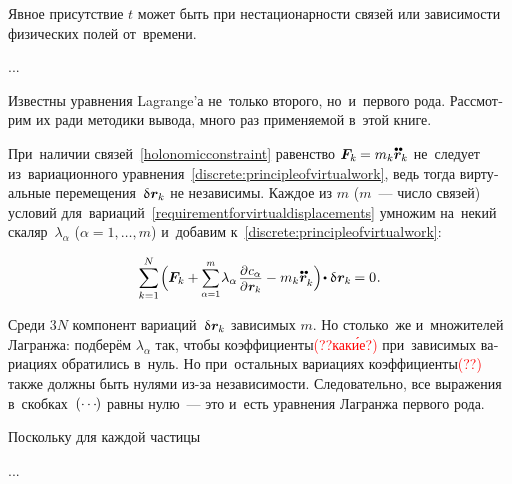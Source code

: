 \begin{otherlanguage}{russian}
\vspace{-0.15em} \noindent Явное присутствие $t$ может быть при нестационарности связей или зависимости физических полей от~времени.

...

Известны уравнения Lagrange’а не~только второго, но~и~первого рода. Рассмотрим их ради методики вывода, много раз применяемой в~этой книге.

При~наличии связей~\eqref{holonomicconstraint} равенство ${\bm{F}_k \hspace{-0.12ex} = m_k \mathdotdotabove{\bm{r}}_k}$ не~следует из~вариационного уравнения~\eqref{discrete:principleofvirtualwork}, ведь тогда виртуальные перемещения~${\variation{\hspace{.1ex}\bm{r}_k}}$ не независимы. Каждое из $m$ ($m$~--- число связей) условий для~вариаций~\eqref{requirementforvirtualdisplacements} умножим на~некий скаляр~$\lambda_{\alpha}$ (${\alpha = 1, \ldots, m}$) и~добавим к~\eqref{discrete:principleofvirtualwork}:

\nopagebreak\vspace{-0.2em}\begin{equation}
\displaystyle \sum_{k=1}^{N} \hspace{-0.2ex} \left(^{\mathstrut} \hspace{-0.16ex} \bm{F}_k \right. \hspace{-0.32ex} + \hspace{-0.05ex}
\scalebox{0.88}[0.92]{$ \displaystyle \sum_{\alpha=1}^{m} $} \hspace{.16ex} \lambda_{\alpha} \hspace{.2ex} \scalebox{0.92}{$\displaystyle \frac{\raisemath{-0.12em}{\partial \hspace{.1ex} c_{\alpha}}}{\partial \hspace{.1ex} \bm{r}_k}$}
- \left. \hspace{-0.25ex} m_k \mathdotdotabove{\bm{r}}_k ^{\mathstrut}\right) \hspace{-0.32ex} \dotp \variation{\hspace{.1ex}\bm{r}_k} \hspace{-0.16ex} = 0 \hspace{0.1ex} .
\end{equation}

\vspace{-0.1em} \noindent Среди $3N$ компонент вариаций~${\variation{\hspace{.1ex}\bm{r}_k}}$ зависимых $m$. Но столько~же и~множителей Лагранжа: подберём $\lambda_{\alpha}$ так, чтобы коэффициенты\textcolor{red}{(??как\'{и}е?)} при~зависимых вариациях обратились в~нуль. Но при~остальных вариациях коэффициенты\textcolor{red}{(??)} также должны быть нулями из\hbox{-}за независимости. Следовательно, все выражения в~скобках~${(\cdots\hspace{-0.2ex})}$ равны нулю~--- это и~есть уравнения Лагранжа первого рода.

Поскольку для каждой частицы

...



\end{otherlanguage}

